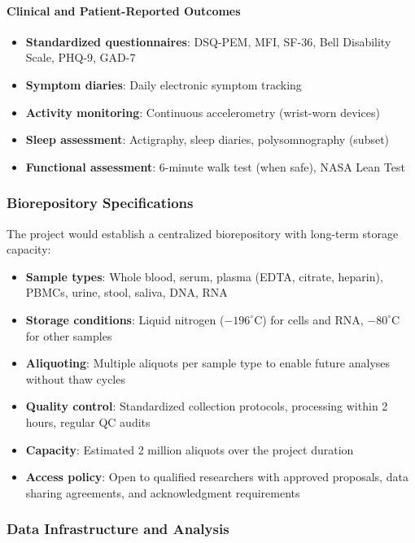 \paragraph{Clinical and Patient-Reported Outcomes}
\begin{itemize}
    \item \textbf{Standardized questionnaires}: DSQ-PEM, MFI, SF-36, Bell Disability Scale, PHQ-9, GAD-7
    \item \textbf{Symptom diaries}: Daily electronic symptom tracking
    \item \textbf{Activity monitoring}: Continuous accelerometry (wrist-worn devices)
    \item \textbf{Sleep assessment}: Actigraphy, sleep diaries, polysomnography (subset)
    \item \textbf{Functional assessment}: 6-minute walk test (when safe), NASA Lean Test
\end{itemize}

\subsubsection{Biorepository Specifications}

The project would establish a centralized biorepository with long-term storage capacity:
\begin{itemize}
    \item \textbf{Sample types}: Whole blood, serum, plasma (EDTA, citrate, heparin), PBMCs, urine, stool, saliva, DNA, RNA
    \item \textbf{Storage conditions}: Liquid nitrogen ($-196^{\circ}$C) for cells and RNA, $-80^{\circ}$C for other samples
    \item \textbf{Aliquoting}: Multiple aliquots per sample type to enable future analyses without thaw cycles
    \item \textbf{Quality control}: Standardized collection protocols, processing within 2 hours, regular QC audits
    \item \textbf{Capacity}: Estimated 2 million aliquots over the project duration
    \item \textbf{Access policy}: Open to qualified researchers with approved proposals, data sharing agreements, and acknowledgment requirements
\end{itemize}

\subsubsection{Data Infrastructure and Analysis}


